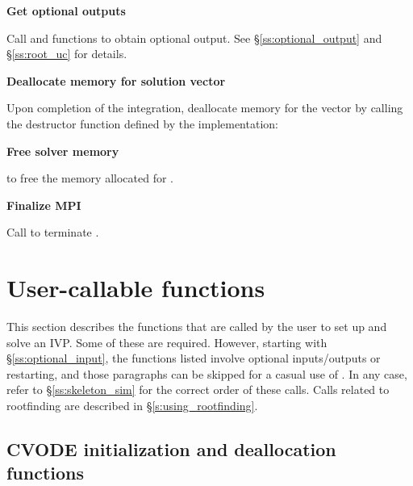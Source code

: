 \begin{Steps}
\item
  {\bf Get optional outputs}

  Call  and  functions to obtain optional output.
  See \S\ref{ss:optional_output} and \S\ref{ss:root_uc} for details.

\item
  {\bf Deallocate memory for solution vector}

  Upon completion of the integration, deallocate memory for the vector 
  by calling the destructor function defined by the {\nvector} implementation:

  {\s} 

  {\p} 
  
\item
  {\bf Free solver memory}

   to free the memory allocated for {\cvode}.
  
\item 
  {\bf {\p} Finalize MPI}

  Call  to terminate {\mpi}.
  
\end{Steps}

\section{User-callable functions}\label{ss:cvode_fct_sim}

This section describes the {\cvode} functions that are called by the
user to set up and solve an IVP. Some of these are required. However,
starting with \S\ref{ss:optional_input}, the functions listed involve
optional inputs/outputs or restarting, and those paragraphs can be
skipped for a casual use of {\cvode}. In any case, refer to
\S\ref{ss:skeleton_sim} for the correct order of these calls.
Calls related to rootfinding are described in \S\ref{s:using_rootfinding}.

\subsection{CVODE initialization and deallocation functions}
\label{sss:cvodemalloc}

